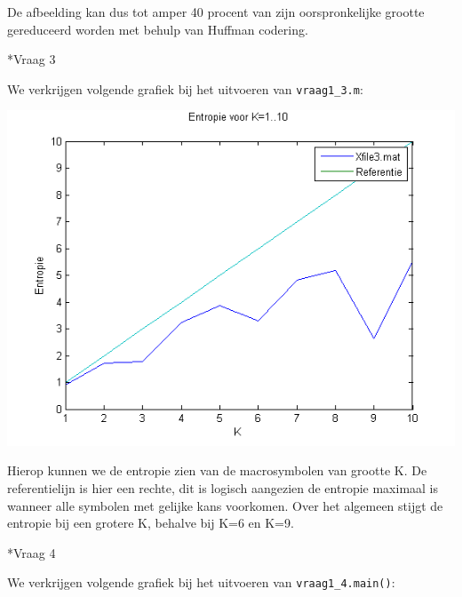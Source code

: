 \documentclass[]{article}
\begin{document}
\begin{section}
\begin{subsection}
        De afbeelding kan dus tot amper 40 procent van zijn
        oorspronkelijke grootte gereduceerd worden met behulp van
        Huffman codering.

    \end{subsection}

    \begin{subsection}*{Vraag 3}

        We verkrijgen volgende grafiek bij het uitvoeren van
        \texttt{vraag1\_3.m}:

        \includegraphics{vraag1_3.png}

        Hierop kunnen we de entropie zien van de macrosymbolen van
        grootte K. De referentielijn is hier een rechte, dit is logisch
        aangezien de entropie maximaal is wanneer alle symbolen met
        gelijke kans voorkomen.
        Over het algemeen stijgt de entropie bij een grotere K, behalve
        bij K=6 en K=9.

    \end{subsection}

    \begin{subsection}*{Vraag 4}

        We verkrijgen volgende grafiek bij het uitvoeren van
        \texttt{vraag1\_4.main()}:


\end{subsection}
\end{section}
\end{document}
